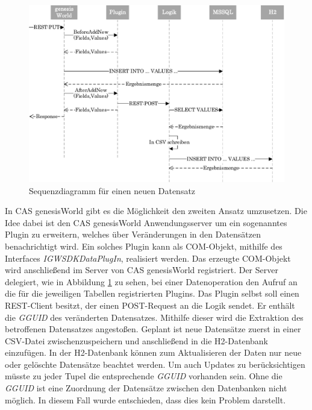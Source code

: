 \begin{figure}[htbp]
\centering
  \includegraphics[width=1.0\textwidth, width=1.0\textwidth]{pics/sequenzdiagramm.pdf}
\caption{Sequenzdiagramm für einen neuen Datensatz}
\label{konzept_sequenz}
\end{figure}

In CAS genesisWorld gibt es die Möglichkeit den zweiten Ansatz umzusetzen. Die Idee dabei ist den CAS genesisWorld Anwendungsserver um ein sogenanntes Plugin zu erweitern, welches über Veränderungen in den Datensätzen benachrichtigt wird. Ein solches Plugin kann als COM-Objekt, mithilfe des Interfaces \textit{IGWSDKDataPlugIn}, realisiert werden. Das erzeugte COM-Objekt wird anschließend im Server von CAS genesisWorld registriert. Der Server delegiert, wie in Abbildung \ref{konzept_sequenz} zu sehen, bei einer Datenoperation den Aufruf an die für die jeweiligen Tabellen registrierten Plugins. Das Plugin selbst soll einen REST-Client besitzt, der einen POST-Request an die Logik sendet. Er enthält die \textit{GGUID} des veränderten Datensatzes. Mithilfe dieser wird die Extraktion des betroffenen Datensatzes angestoßen. Geplant ist neue Datensätze zuerst in einer CSV-Datei zwischenzuspeichern und anschließend in die H2-Datenbank einzufügen. In der H2-Datenbank können zum Aktualisieren der Daten nur neue oder gelöschte Datensätze beachtet werden. Um auch Updates zu berücksichtigen müsste zu jeder Tupel die entsprechende \textit{GGUID} vorhanden sein. Ohne die \textit{GGUID} ist eine Zuordnung der Datensätze zwischen den Datenbanken nicht möglich. In diesem Fall wurde entschieden, dass dies kein Problem darstellt.

